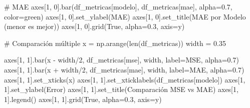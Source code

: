 \documentclass[
  doc,
  floatsintext,
  longtable,
  a4paper,
  nolmodern,
  notxfonts,
  notimes,
  12pt,
  colorlinks=true,linkcolor=blue,citecolor=blue,urlcolor=blue]{apa7}
\newenvironment{Shaded}{\begin{snugshade}}{\end{snugshade}}
\newcommand{\BuiltInTok}[1]{\textcolor[rgb]{0.00,0.23,0.31}{#1}}
\newcommand{\CommentTok}[1]{\textcolor[rgb]{0.37,0.37,0.37}{#1}}
\newcommand{\DecValTok}[1]{\textcolor[rgb]{0.68,0.00,0.00}{#1}}
\newcommand{\FloatTok}[1]{\textcolor[rgb]{0.68,0.00,0.00}{#1}}
\newcommand{\NormalTok}[1]{\textcolor[rgb]{0.00,0.23,0.31}{#1}}
\newcommand{\OperatorTok}[1]{\textcolor[rgb]{0.37,0.37,0.37}{#1}}
\newcommand{\StringTok}[1]{\textcolor[rgb]{0.13,0.47,0.30}{#1}}
\newcommand{\VariableTok}[1]{\textcolor[rgb]{0.07,0.07,0.07}{#1}}
\begin{document}
\begin{Shaded}
\begin{Highlighting}[]
\CommentTok{\# MAE}
\NormalTok{axes[}\DecValTok{1}\NormalTok{, }\DecValTok{0}\NormalTok{].bar(df\_metricas[}\StringTok{\textquotesingle{}modelo\textquotesingle{}}\NormalTok{], df\_metricas[}\StringTok{\textquotesingle{}mae\textquotesingle{}}\NormalTok{], }
\NormalTok{              alpha}\OperatorTok{=}\FloatTok{0.7}\NormalTok{, color}\OperatorTok{=}\StringTok{\textquotesingle{}green\textquotesingle{}}\NormalTok{)}
\NormalTok{axes[}\DecValTok{1}\NormalTok{, }\DecValTok{0}\NormalTok{].set\_ylabel(}\StringTok{\textquotesingle{}MAE\textquotesingle{}}\NormalTok{)}
\NormalTok{axes[}\DecValTok{1}\NormalTok{, }\DecValTok{0}\NormalTok{].set\_title(}\StringTok{\textquotesingle{}MAE por Modelo (menor es mejor)\textquotesingle{}}\NormalTok{)}
\NormalTok{axes[}\DecValTok{1}\NormalTok{, }\DecValTok{0}\NormalTok{].grid(}\VariableTok{True}\NormalTok{, alpha}\OperatorTok{=}\FloatTok{0.3}\NormalTok{, axis}\OperatorTok{=}\StringTok{\textquotesingle{}y\textquotesingle{}}\NormalTok{)}

\CommentTok{\# Comparación múltiple}
\NormalTok{x }\OperatorTok{=}\NormalTok{ np.arange(}\BuiltInTok{len}\NormalTok{(df\_metricas))}
\NormalTok{width }\OperatorTok{=} \FloatTok{0.35}

\NormalTok{axes[}\DecValTok{1}\NormalTok{, }\DecValTok{1}\NormalTok{].bar(x }\OperatorTok{{-}}\NormalTok{ width}\OperatorTok{/}\DecValTok{2}\NormalTok{, df\_metricas[}\StringTok{\textquotesingle{}mse\textquotesingle{}}\NormalTok{], width, }
\NormalTok{              label}\OperatorTok{=}\StringTok{\textquotesingle{}MSE\textquotesingle{}}\NormalTok{, alpha}\OperatorTok{=}\FloatTok{0.7}\NormalTok{)}
\NormalTok{axes[}\DecValTok{1}\NormalTok{, }\DecValTok{1}\NormalTok{].bar(x }\OperatorTok{+}\NormalTok{ width}\OperatorTok{/}\DecValTok{2}\NormalTok{, df\_metricas[}\StringTok{\textquotesingle{}mae\textquotesingle{}}\NormalTok{], width, }
\NormalTok{              label}\OperatorTok{=}\StringTok{\textquotesingle{}MAE\textquotesingle{}}\NormalTok{, alpha}\OperatorTok{=}\FloatTok{0.7}\NormalTok{)}
\NormalTok{axes[}\DecValTok{1}\NormalTok{, }\DecValTok{1}\NormalTok{].set\_xticks(x)}
\NormalTok{axes[}\DecValTok{1}\NormalTok{, }\DecValTok{1}\NormalTok{].set\_xticklabels(df\_metricas[}\StringTok{\textquotesingle{}modelo\textquotesingle{}}\NormalTok{])}
\NormalTok{axes[}\DecValTok{1}\NormalTok{, }\DecValTok{1}\NormalTok{].set\_ylabel(}\StringTok{\textquotesingle{}Error\textquotesingle{}}\NormalTok{)}
\NormalTok{axes[}\DecValTok{1}\NormalTok{, }\DecValTok{1}\NormalTok{].set\_title(}\StringTok{\textquotesingle{}Comparación MSE vs MAE\textquotesingle{}}\NormalTok{)}
\NormalTok{axes[}\DecValTok{1}\NormalTok{, }\DecValTok{1}\NormalTok{].legend()}
\NormalTok{axes[}\DecValTok{1}\NormalTok{, }\DecValTok{1}\NormalTok{].grid(}\VariableTok{True}\NormalTok{, alpha}\OperatorTok{=}\FloatTok{0.3}\NormalTok{, axis}\OperatorTok{=}\StringTok{\textquotesingle{}y\textquotesingle{}}\NormalTok{)}


\end{Highlighting}
\end{Shaded}
\end{document}

